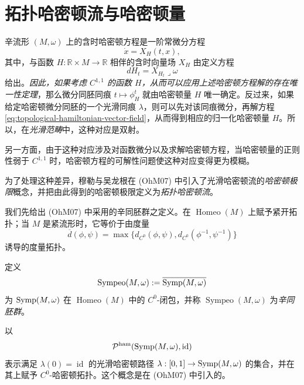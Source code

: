 \section{拓扑哈密顿流与哈密顿量}
\label{sec:topological-hamiltonian-flows-hamiltonians}

辛流形 $(M,\omega)$ 上的含时哈密顿方程是一阶常微分方程
\[
 \dot x=X_H(t,x),
\]
其中，与函数 $H:\mathbb R\times M\to\mathbb R$ 相伴的含时向量场
$X_H$ 由定义方程
\begin{equation}
 dH_t=X_{H_t}\mathbin{\lrcorner}\omega
 \label{eq:topological-hamiltonian-vector-field}
\end{equation}
给出。\emph{因此，如果考虑 $C^{1,1}$ 的函数 $H$，从而可以应用上述哈密顿方程解的存在唯一性定理}，那么微分同胚同痕
$t\mapsto\phi_H^t$ 就由哈密顿量 $H$ 唯一确定。反过来，如果给定哈密顿微分同胚的一个光滑同痕
$\lambda$，则可以先对该同痕微分，再解方程
\eqref{eq:topological-hamiltonian-vector-field}，从而得到相应的归一化哈密顿量 $H$。所以，在\emph{光滑范畴}中，这种对应是双射。

另一方面，由于这种对应涉及对函数微分以及求解哈密顿方程，当哈密顿量的正则性弱于
$C^{1,1}$ 时，哈密顿方程的可解性问题使这种对应变得更为模糊。

为了处理这种差异，穆勒与吴龙根在 (OhM07) 中引入了光滑哈密顿流的\emph{哈密顿极限}概念，并把由此得到的哈密顿极限定义为\emph{拓扑哈密顿流}。

我们先给出 (OhM07) 中采用的辛同胚群之定义。在
$\operatorname{Homeo}(M)$ 上赋予紧开拓扑；当 $M$ 是紧流形时，它等价于由度量
\[
 \overline d(\phi,\psi)
 =\max\bigl\{d_{C^0}(\phi,\psi),
 d_{C^0}(\phi^{-1},\psi^{-1})\bigr\}
\]
诱导的度量拓扑。

\begin{definition}[辛同胚群]\label{def:symplectic-homeomorphism-group}
定义
\[
 \operatorname{Sympeo}(M,\omega)
 :=\overline{\operatorname{Symp}(M,\omega)}
\]
为 $\operatorname{Symp}(M,\omega)$ 在 $\operatorname{Homeo}(M)$ 中的
$C^0$-闭包，并称 $\operatorname{Sympeo}(M,\omega)$ 为\emph{辛同胚群}。
\end{definition}

以
\[
 \mathcal P^{\mathrm{ham}}(\operatorname{Symp}(M,\omega),\operatorname{id})
\]
表示满足 $\lambda(0)=\operatorname{id}$ 的光滑哈密顿路径
$\lambda:[0,1]\to\operatorname{Symp}(M,\omega)$ 的集合，并在其上赋予
$C^0$-哈密顿拓扑。这个概念是在 (OhM07) 中引入的。

